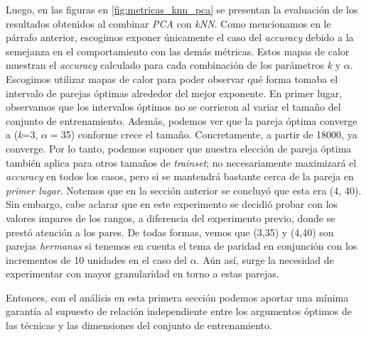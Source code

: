 \par
Luego, en las figuras en \ref{fig:metricas_knn_pca} se presentan la evaluación de los resultados obtenidos al combinar \emph{PCA} con \emph{kNN}. Como mencionamos en le párrafo anterior, escogimos exponer únicamente el caso del \emph{accuracy} debido a la semejanza en el comportamiento con las demás métricas. Estos mapas de calor muestran el \emph{accuracy} calculado para cada combinación de los parámetros \emph{k} y $\alpha$. Escogimos utilizar mapas de calor para poder observar qué forma tomaba el intervalo de parejas óptimas alrededor del mejor exponente. En primer lugar, observamos que los intervalos óptimos no se corrieron al variar el tamaño del conjunto de entrenamiento. Además, podemos ver que la pareja óptima converge a (\emph{k}=3, $\alpha=$35) conforme crece el tamaño. Concretamente, a partir de 18000, ya converge. Por lo tanto, podemos suponer que nuestra elección de pareja óptima también aplica para otros tamaños de \emph{trainset}; no necesariamente maximizará el \emph{accuracy} en todos los casos, pero si se mantendrá bastante cerca de la pareja en \emph{primer lugar}. Notemos que en la sección anterior se concluyó que esta era (4, 40). Sin embargo, cabe aclarar que en este experimento se decidió probar con los valores impares de los rangos, a diferencia del experimento previo, donde se prestó atención a los pares. De todas formas, vemos que (3,35) y (4,40) son parejas \emph{hermanas} si tenemos en cuenta el tema de paridad en conjunción con los incrementos de 10 unidades en el caso del $\alpha$. Aún así, surge la necesidad de experimentar con mayor granularidad en torno a estas parejas.
\par
Entonces, con el análisis en esta primera sección podemos aportar una mínima garantía al supuesto de relación independiente entre los argumentos óptimos de las técnicas y las dimensiones del conjunto de entrenamiento.

